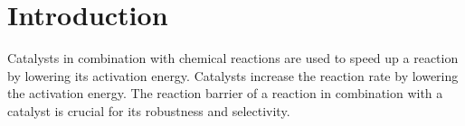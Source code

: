 
\chapter{Introduction}
\label{ch:Introduction}


Catalysts in combination with chemical reactions are used to speed up a reaction by lowering its activation energy. 
Catalysts increase the reaction rate by lowering the activation energy.
The reaction barrier of a reaction in combination with a catalyst is crucial for its robustness and selectivity.

